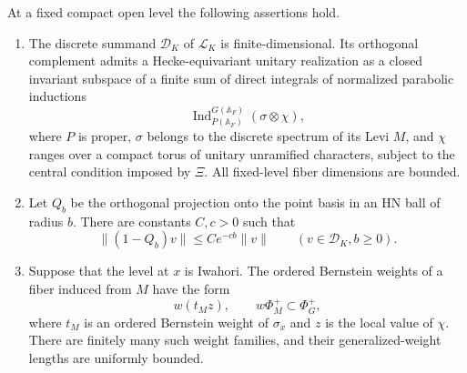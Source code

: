 \begin{proposition}\label{ext:spectral}
 At a fixed compact open level the following assertions hold.
 \begin{enumerate}[label=\textup{(\roman*)}]
 \item The discrete summand $\mathcal D_K$ of $\mathcal L_K$ is
 finite-dimensional.  Its orthogonal complement admits a Hecke-equivariant unitary
 realization as a closed invariant subspace of a finite sum of
 direct integrals of normalized parabolic inductions
 \[
    \operatorname{Ind}_{P(\mathbb A_F)}^{G(\mathbb A_F)}
                 (\sigma\otimes\chi),
 \]
 where $P$ is proper, $\sigma$ belongs to the discrete spectrum of its
 Levi $M$, and $\chi$ ranges over a compact torus of unitary unramified
 characters, subject to the central condition imposed by $\Xi$.
 All fixed-level fiber dimensions are bounded.
 \item Let $Q_b$ be the orthogonal projection onto the point basis in an
 HN ball of radius $b$.  There are constants $C,c>0$ such that
 \begin{equation}\label{ext:discrete-tail}
   \|(1-Q_b)v\|\le C e^{-cb}\|v\|
       \qquad(v\in\mathcal D_K, b\ge0).
 \end{equation}
 \item Suppose that the level at $x$ is Iwahori.  The ordered Bernstein
 weights of a fiber induced from $M$ have the form
 \begin{equation}\label{ext:induced-weights}
      w(t_M z),\qquad w\Phi_M^+\subset\Phi_G^+,
 \end{equation}
 where $t_M$ is an ordered Bernstein weight of $\sigma_x$ and $z$ is the
 local value of $\chi$.  There are finitely many such weight families,
 and their generalized-weight lengths are uniformly bounded.
 \end{enumerate}
\end{proposition}

